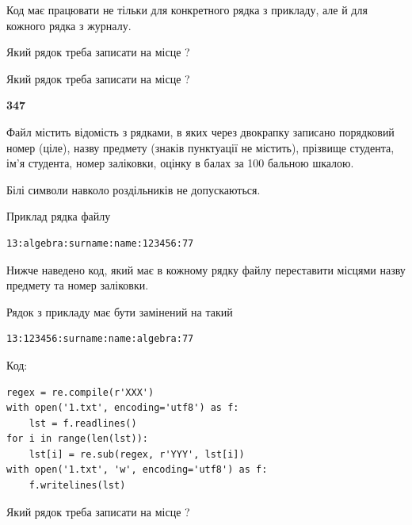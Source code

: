 Код має працювати не тільки для конкретного рядка з прикладу, але й для кожного рядка з журналу.




Який рядок треба записати на місце  ?\par
\vspace{5mm}


Який рядок треба записати на місце  ?\par


\newpage

{\begin {center}\textbf{ 347}\end {center}}\par
Файл  містить відомість з рядками, в яких через двокрапку записано поряд\-ковий номер (ціле), назву предмету (знаків пунктуації не містить), прізвище студента, ім'я студента, номер заліковки, оцінку в балах за 100 бальною шкалою.

Білі символи навколо роздільників не допускаються.

Приклад рядка файлу



\begin{verbatim}
13:algebra:surname:name:123456:77
\end{verbatim}


Нижче наведено код, який має в кожному рядку файлу переставити місцями назву предмету та номер заліковки.

Рядок з прикладу має бути замінений на такий



\begin{verbatim}
13:123456:surname:name:algebra:77
\end{verbatim}




Код:



\begin{verbatim}
regex = re.compile(r'XXX')
with open('1.txt', encoding='utf8') as f:
    lst = f.readlines()
for i in range(len(lst)):
    lst[i] = re.sub(regex, r'YYY', lst[i])
with open('1.txt', 'w', encoding='utf8') as f:
    f.writelines(lst)
\end{verbatim}







Який рядок треба записати на місце  ?\par
\vspace{5mm}


